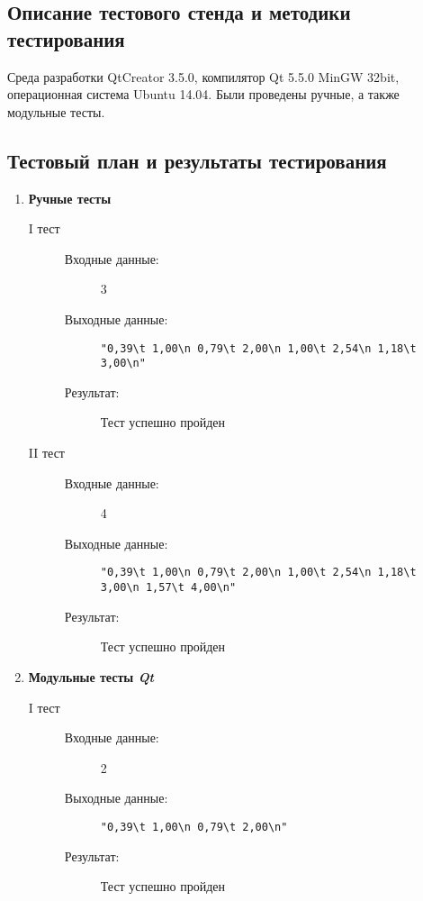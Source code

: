 \documentclass[12pt,a4paper]{report}
\begin{document}
\subsection{Описание тестового стенда и методики тестирования}
\hspace{\parindent}
Среда разработки QtCreator 3.5.0, компилятор Qt 5.5.0 MinGW 32bit, операционная система Ubuntu 14.04. Были проведены ручные, а также модульные тесты.

\subsection{Тестовый план и результаты тестирования}
\hspace{\parindent}
\begin{enumerate}
\item \textbf{Ручные тесты}
\begin{description}
\item[I тест]
\hspace{\parindent}
\begin{flushleft}
\begin{description}
\item[Входные данные:] 3
\item[Выходные данные:]  \verb/"0,39\t 1,00\n 0,79\t 2,00\n 1,00\t 2,54\n 1,18\t 3,00\n"/ 
\item[Результат:] Тест успешно пройден
\end{description}
\end{flushleft}
\end{description}

\begin{description}
\item[II тест]
\hspace{\parindent}
\begin{flushleft}
\begin{description}
\item[Входные данные:] 4
\item[Выходные данные:] \verb/"0,39\t 1,00\n 0,79\t 2,00\n 1,00\t 2,54\n 1,18\t 3,00\n 1,57\t 4,00\n"/ 
\item[Результат:] Тест успешно пройден
\end{description}
\end{flushleft}
\end{description}

\item \textbf{Модульные тесты \textit{Qt}}
\begin{description}
\item[I тест]
\hspace{\parindent}
\begin{flushleft}
\begin{description}
\item[Входные данные:] 2
\item[Выходные данные:] \verb/"0,39\t 1,00\n 0,79\t 2,00\n"/ 
\item[Результат:] Тест успешно пройден
\end{description}
\end{flushleft}
\end{description}


\end{enumerate}
\end{document}
